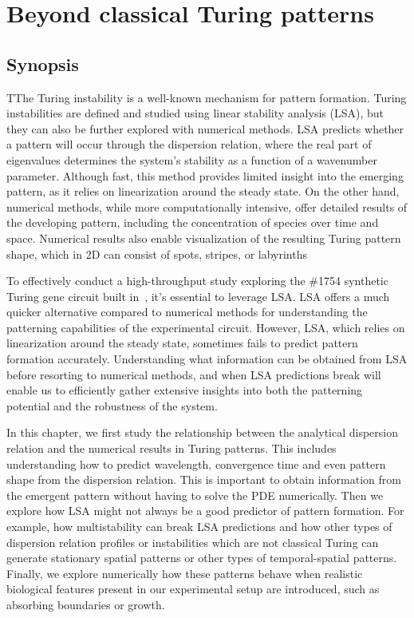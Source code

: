 \chapter{Beyond classical Turing patterns}\label{Chapter 1}
\section{Synopsis}
TThe Turing instability is a well-known mechanism for pattern formation. Turing instabilities are defined and studied using linear stability analysis (LSA), but they can also be further explored with numerical methods. LSA predicts whether a pattern will occur through the dispersion relation, where the real part of eigenvalues determines the system's stability as a function of a wavenumber parameter. Although fast, this method provides limited insight into the emerging pattern, as it relies on linearization around the steady state. On the other hand, numerical methods, while more computationally intensive, offer detailed results of the developing pattern, including the concentration of species over time and space. Numerical results also enable visualization of the resulting Turing pattern shape, which in 2D can consist of spots, stripes, or labyrinths

To effectively conduct a high-throughput study exploring the \#1754 synthetic Turing gene circuit built in~\cite{Tica2020}, it's essential to leverage LSA.
LSA offers a much quicker alternative compared to numerical methods for understanding the patterning capabilities of the experimental circuit.
However, LSA, which relies on linearization around the steady state, sometimes fails to predict pattern formation accurately.
Understanding what information can be obtained from LSA before resorting to numerical methods, and when LSA predictions break will enable us to efficiently gather extensive insights into both the patterning potential and the robustness of the system.

In this chapter, we first study the relationship between the analytical dispersion relation and the numerical results in Turing patterns.
This includes understanding how to predict wavelength,
convergence time and even pattern shape from the dispersion relation.
This is important to obtain information from the emergent pattern without having to solve the PDE numerically.
Then we explore how LSA might not always be a good predictor of pattern formation.
For example, how multistability can break LSA predictions and how other types of dispersion relation profiles or instabilities which are not classical Turing can generate stationary spatial patterns or other types of temporal-spatial patterns.
Finally, we explore numerically how these patterns behave when realistic biological features present in our experimental setup are introduced, such as absorbing boundaries or growth.



